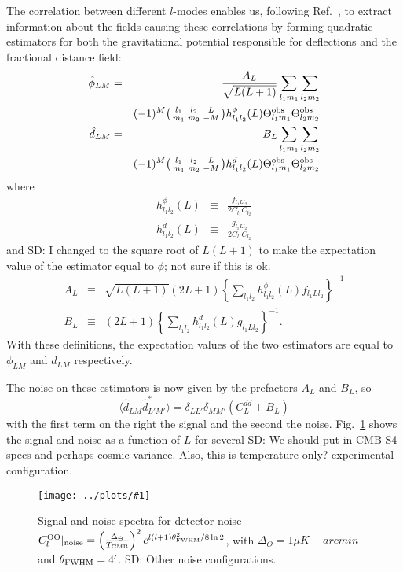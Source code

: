 \documentclass[prl,amsmath,amssymb,floatfix,superscriptaddress,nofootinbib,twocolumn]{revtex4-1}
\def\be{\begin{equation}}
\def\ee{\end{equation}}
\def\bea{\begin{eqnarray}}
\def\eea{\end{eqnarray}}
\newcommand{\eql}[1]{\label{eq:#1}}
\newcommand{\sfig}[2]{
\texttt{[image: ../plots/\#1]}
        }
\newcommand{\Spng}[2]{
   \begin{figure}[thbp]
   \begin{center}
    \sfig{#1.png}{\columnwidth}
    \caption{{\small #2}}
    \label{fig:#1}
     \end{center}
   \end{figure}
}
\newcommand{\rf}[1]{\ref{fig:#1}}
\newcommand{\scott}[1]{{\color{darkgreen} SD: #1}}
\begin{document}
The correlation between different $l$-modes enables us, following Ref.~\cite{Okamoto:2003zw}, to extract information about the fields causing these correlations by forming quadratic estimators for both the gravitational potential responsible for deflections and the fractional distance field:
\bea
\hat \phi_{LM} &=& \frac{A_{L}}{\sqrt{L(L+1)}}\sum_{l_1m_1}\sum_{l_2m_2} \nonumber \\  
&& (-1)^M  \bigl(\begin{smallmatrix} l_1 & l_2 & L \\ m_1 & m_2 & -M  \end{smallmatrix}\bigr) h^{\phi}_{l_1l_2}(L)  \tob_{l_1m_1} \tob_{l_2m_2} \\
\hat d_{LM} &=& B_{L} \sum_{l_1m_1}\sum_{l_2m_2}\nonumber \\
&& (-1)^M  \bigl(\begin{smallmatrix} l_1 & l_2 & L \\ m_1 & m_2 & -M  \end{smallmatrix}\bigr) h^{d}_{l_1l_2}(L)  \tob_{l_1m_1} \tob_{l_2m_2}\eql{distest}
\eea
where
\bea
h^{\phi}_{l_1l_2}(L)&\equiv& \frac{f_{l_1Ll_2}}{2C_{l_1}C_{l_2}} \\
h^{d}_{l_1l_2}(L)&\equiv& \frac{g_{l_1Ll_2}}{2C_{l_1}C_{l_2}}
\eea
and \scott{I changed to the square root of $L(L+1)$ to make the expectation value of the estimator equal to $\phi$; not sure if this is ok.}
\bea
A_L &\equiv& \sqrt{L(L+1)}(2L+1) \left\{ \sum_{l_1l_2} h^{\phi}_{l_1l_2}(L)f_{l_1Ll_2}\right\}^{-1}\\
B_L &\equiv& (2L+1) \left\{ \sum_{l_1l_2} h^{d}_{l_1l_2}(L)g_{l_1Ll_2}\right\}^{-1}.\eql{bt}
\eea 
With these definitions, the expectation values of the two estimators are equal to $\phi_{LM}$ and $d_{LM}$ respectively.

The noise on these estimators is now given by the prefactors $A_L$ and $B_L$, so  
\be
\langle \hat d_{LM} \hat d^*_{L'M'}  \rangle = \delta_{LL'}\delta_{MM'} \left( C_L^{dd} + B_L \right)
\ee
with the first term on the right the signal and the second the noise. Fig.~\rf{Delay} shows the signal and noise as a function of $L$ for several \scott{We should put in CMB-S4 specs and perhaps cosmic variance. Also, this is temperature only?} experimental configuration.
\Spng{Delay}{Signal and noise spectra for detector noise $C_{l}^{\Theta \Theta}|_{\rm noise} = \left(\frac{\Delta_{\Theta}}{T_{\rm CMB}} \right)^{2} e^{l(l+1)\theta_{\rm FWHM}^{2}/8 \, \rm ln \,2}$, with $\Delta_{\Theta}=1\mu K-arcmin$ and $\theta_{\rm FWHM}=4'$. \scott{Other noise configurations.}}
\end{document}
